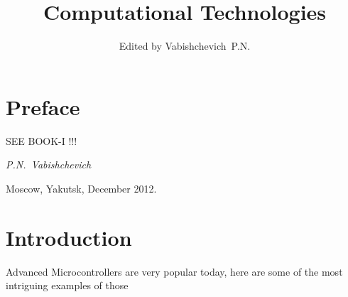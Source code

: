 \documentclass[openany]{cspmB}
\begin{document}
\title[Advanced Topics]
{Computational Technologies}

\author{Edited by Vabishchevich~P.N.}


\maketitle 


\renewcommand{\contentsname}{Contents}
\tableofcontents

\chapter*{Preface} 

SEE BOOK-I !!!

\begin{flushright}
{\it
P.N.~Vabishchevich

Moscow, Yakutsk, December 2012.
}
\end{flushright}

\chapter*{Introduction}

Advanced Microcontrollers are very popular today, here are some of the most intriguing examples of those





\end{document}
